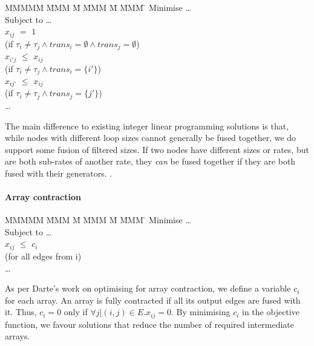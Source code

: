 \begin{tabbing}
MMMMM   \= MMM \= M \= MMM \= M \= MMM \= \kill
Minimise   \> \ldots \\
Subject to \> \ldots \\
           \> $x_{ij}$    \> $=$   \> $1$             \>       \>            \\
           \> (if $\tau_i \not= \tau_j \wedge trans_i=\emptyset \wedge trans_j=\emptyset$)                 \\
           \> $x_{i'j}$   \> $\le$ \> $x_{ij}$        \>       \>            \\
           \> (if $\tau_i \not= \tau_j \wedge trans_i=\{i'\}$) \\
           \> $x_{ij'}$   \> $\le$ \> $x_{ij}$        \>       \>            \\
           \> (if $\tau_i \not= \tau_j \wedge trans_j=\{j'\}$) \\
           \> \ldots
\end{tabbing}
The main difference to existing integer linear programming solutions is that, while nodes with different loop sizes cannot generally be fused together, we do support some fusion of filtered sizes. If two nodes have different sizes or rates, but are both sub-rates of another rate, they \emph{can} be fused together if they are both fused with their generators.   .


\paragraph{Array contraction}
\begin{tabbing}
MMMMM   \= MMM \= M \= MMM \= M \= MMM \= \kill
Minimise   \> \ldots \\
Subject to \> \ldots \\
           \> $x_{ij}$    \> $\le$ \> $c_i$           \>       \>            \\
           \> (for all edges from i)            \\
           \> \ldots \\
\end{tabbing}
As per Darte's work on optimising for array contraction\cite{darte2002contraction}, we define a variable $c_i$ for each array.
An array is fully contracted if all its output edges are fused with it. Thus, $c_i=0$ only if $\forall j | (i,j) \in E. x_{ij} = 0$. By minimising $c_i$ in the objective function, we favour solutions that reduce the number of required intermediate arrays. 


